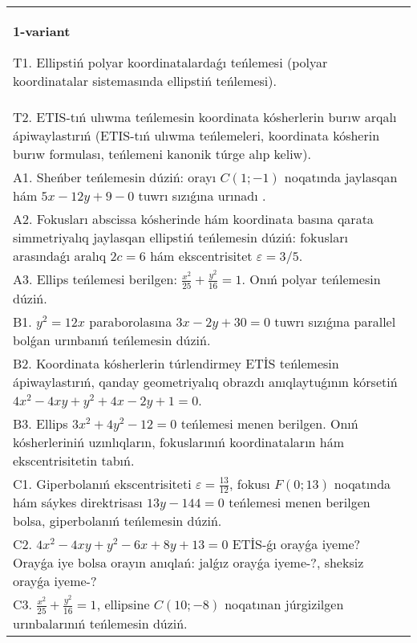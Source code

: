 \documentclass{article}
\begin{document}
\large
{}


\begin{tabular}{m{17cm}}
\textbf{1-variant}
\newline

T1. Ellipstiń polyar koordinatalardaǵı teńlemesi (polyar koordinatalar sistemasında ellipstiń teńlemesi).\\

T2. ETIS-tıń ulıwma teńlemesin koordinata kósherlerin burıw arqalı ápiwaylastırıń (ETIS-tıń ulıwma teńlemeleri, koordinata kósherin burıw formulası, teńlemeni kanonik túrge alıp keliw).\\

A1. Sheńber teńlemesin dúziń: orayı $C (1;-1) $ noqatında jaylasqan hám $5 x-12 y+9 -0$ tuwrı sızıǵına urınadı .\\

A2. Fokusları abscissa kósherinde hám koordinata basına qarata simmetriyalıq jaylasqan ellipstiń teńlemesin dúziń: fokusları arasındaǵı aralıq $2 c=6$ hám ekscentrisitet $\varepsilon=3/5$.\\

A3. Ellips teńlemesi berilgen: $\frac{x^2}{25}+\frac{y^2}{16}=1$. Onıń polyar teńlemesin dúziń.\\

B1. $y^{2} = 12x$ paraborolasına $3x - 2y + 30 = 0$ tuwrı sızıǵına parallel bolǵan urınbanıń teńlemesin dúziń.  \\

B2. Koordinata kósherlerin túrlendirmey ETİS teńlemesin ápiwaylastırıń, qanday geometriyalıq obrazdı anıqlaytuǵının kórsetiń $4x^{2} - 4xy + y^{2} + 4x - 2y + 1 = 0$.  \\

B3. Ellips $3x^{2} + 4y^{2} - 12 = 0$ teńlemesi menen berilgen. Onıń kósherleriniń uzınlıqların, fokuslarınıń koordinataların hám ekscentrisitetin tabıń.  \\

C1. Giperbolanıń ekscentrisiteti $\varepsilon = \frac{13}{12}$, fokusı $F(0;13)$ noqatında hám sáykes direktrisası $13y - 144 = 0$ teńlemesi menen berilgen bolsa, giperbolanıń teńlemesin dúziń.  \\

C2. $4x^{2} - 4xy + y^{2} - 6x + 8y + 13 = 0$ ETİS-ǵı orayǵa iyeme? Orayǵa iye bolsa orayın anıqlań: jalǵız orayǵa iyeme-?, sheksiz orayǵa iyeme-?  \\

C3. $\frac{x^{2}}{25} + \frac{y^{2}}{16} = 1$, ellipsine $C(10; - 8)$ noqatınan júrgizilgen urınbalarınıń teńlemesin dúziń.  \\

\end{tabular}
\vspace{1cm}
\end{document}
